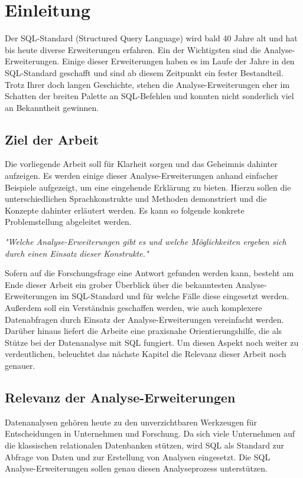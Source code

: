 \chapter{Einleitung}
\label{chap:einleitung} Der SQL-Standard (Structured Query Language) wird bald 40
Jahre alt und hat bis heute diverse Erweiterungen erfahren. Ein der Wichtigsten
sind die Analyse-Erweiterungen. Einige dieser Erweiterungen haben es im Laufe der
Jahre in den SQL-Standard geschafft und sind ab diesem Zeitpunkt ein fester Bestandteil.
Trotz Ihrer doch langen Geschichte, stehen die Analyse-Erweiterungen eher im Schatten
der breiten Palette an SQL-Befehlen und konnten nicht sonderlich viel an Bekanntheit
gewinnen.

\section{Ziel der Arbeit}
\label{sec:ziel_der_arbeit} Die vorliegende Arbeit soll für Klarheit sorgen und das
Geheimnis dahinter aufzeigen. Es werden einige dieser Analyse-Erweiterungen
anhand einfacher Beispiele aufgezeigt, um eine eingehende Erklärung zu bieten.
Hierzu sollen die unterschiedlichen Sprachkonstrukte und Methoden demonstriert
und die Konzepte dahinter erläutert werden. Es kann so folgende konkrete Problemstellung
abgeleitet werden.
\begin{center}
	\textit{"Welche Analyse-Erweiterungen gibt es und welche Möglichkeiten ergeben
	sich durch einen Einsatz dieser Konstrukte."}
\end{center}
Sofern auf die Forschungsfrage eine Antwort gefunden werden kann, besteht am Ende
dieser Arbeit ein grober Überblick über die bekanntesten Analyse-Erweiterungen im
SQL-Standard und für welche Fälle diese eingesetzt werden. Außerdem soll ein
Verständnis geschaffen werden, wie auch komplexere Datenabfragen durch Einsatz der
Analyse-Erweiterungen vereinfacht werden. Darüber hinaus liefert die Arbeite
eine praxisnahe Orientierungshilfe, die als Stütze bei der Datenanalyse mit SQL fungiert.
Um diesen Aspekt noch weiter zu verdeutlichen, beleuchtet das nächste Kapitel die
Relevanz dieser Arbeit noch genauer.

\section{Relevanz der Analyse-Erweiterungen}
\label{sec:relevant} Datenanalysen gehören heute zu den unverzichtbaren Werkzeugen
für Entscheidungen in Unternehmen und Forschung. Da sich viele Unternehmen auf
die klassischen relationalen Datenbanken stützen, wird SQL als Standard zur Abfrage
von Daten und zur Erstellung von Analysen eingesetzt. Die SQL Analyse-Erweiterungen
sollen genau diesen Analyseprozess unterstützen.

